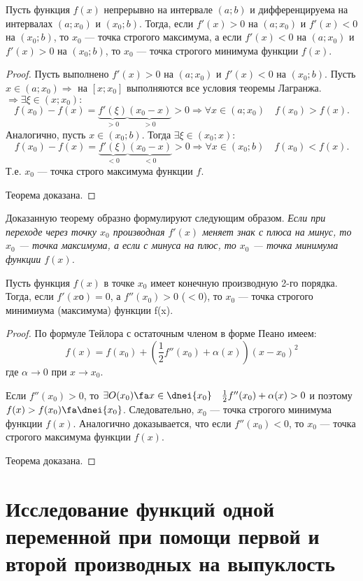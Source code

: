 \begin{thm} Пусть функция $f(x)$ непрерывно на интервале $(a;b)$ и дифференцируема на интервалах $(a;x_0)$ и $(x_0;b)$. Тогда, если $f'(x) > 0$ на $(a;x_0)$ и $f'(x) < 0$ на $(x_0;b)$, то $x_0$ --- точка строгого максимума, а если $f'(x) < 0$ на $(a;x_0)$ и $f'(x) > 0$ на $(x_0;b)$, то $x_0$ --- точка строгого минимума функции $f(x)$.
\end{thm}
\begin{proof}
Пусть выполнено $f'(x) > 0$ на $(a;x_0)$ и $f'(x) < 0$ на $(x_0;b)$. Пусть $x \in (a;x_0) \Rightarrow$ на $[x;x_0]$ выполняются все условия теоремы Лагранжа. $\Rightarrow \exists \xi \in (x;x_0):$ 
$$
f(x_0)-f(x) = \underbrace{f'(\xi)}_{>0} \underbrace{(x_0-x)}_{>0} >0 \Rightarrow \forall x \in (a;x_0)\quad f(x_0) > f(x).
$$
Аналогично, пусть $x\in(x_0;b)$. Тогда $\exists \xi \in (x_0;x):$
$$
f(x_0)-f(x) = \underbrace{f'(\xi)}_{<0} \underbrace{(x_0-x)}_{<0} >0 \Rightarrow \forall x \in (x_0;b) \quad f(x_0) < f(x).
$$
Т.е. $x_0$ --- точка строго максимума функции $f$.

\noindent
Теорема доказана.
\end{proof}
Доказанную теорему образно формулируют следующим образом. \textit{Если при переходе через точку $x_0$ производная $f'(x)$ меняет знак с плюса на минус, то $x_0$ --- точка максимума, а если с минуса на плюс, то $x_0$ --- точка минимума функции $f(x)$.}
\begin{thm}  Пусть функция $f(x)$ в точке $x_0$ имеет конечную производную 2-го порядка. Тогда, если $f'(xо) = 0$, а $f''(x_0) > 0$ ($<0$), то $x_0$ --- точка строгого минимиума (максимума) функции f(x).
\end{thm}

\begin{proof}
По формуле Тейлора с остаточным членом в форме Пеано имеем:	
$$
f(x)=f(x_0)+\left(\frac{1}{2}f''(x_0)+\alpha(x)\right)(x-x_0)^2
$$
где $\alpha \to 0$ при $x \to x_0$.
 
Если $f''(x_0) > 0$, то $\exists O(x_0) \fa x\in\dnei{x_0}\quad\frac{1}{2}f''(x_0)+\alpha(x)>0$
и поэтому $f(x) > f(x_0) \fa \dnei{x_0}$. Следовательно, $x_0$ --- точка строгого минимума функции $f(x)$.
Аналогично доказывается, что если $ f''(x_0) < 0$, то $x_0$ — точка строгого максимума функции $f(x)$.

\noindent
Теорема доказана.
\end{proof}


\section{Исследование функций одной переменной при помощи первой и второй производных на выпуклость}

